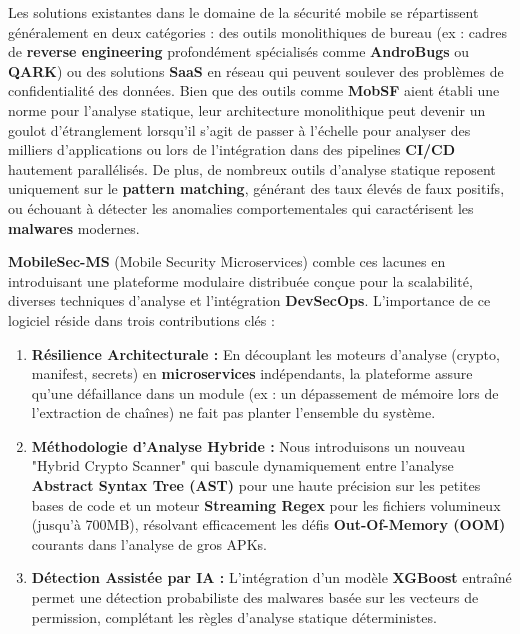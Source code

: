 \documentclass[
  journal=largetwo,
  manuscript=article-type,
  year=2025,
  volume=1,
]{cup-journal}
\begin{document}
Les solutions existantes dans le domaine de la sécurité mobile se répartissent généralement en deux catégories : des outils monolithiques de bureau (ex : cadres de \textbf{reverse engineering} profondément spécialisés comme \textbf{AndroBugs} ou \textbf{QARK}) ou des solutions \textbf{SaaS} en réseau qui peuvent soulever des problèmes de confidentialité des données. Bien que des outils comme \textbf{MobSF} aient établi une norme pour l'analyse statique, leur architecture monolithique peut devenir un goulot d'étranglement lorsqu'il s'agit de passer à l'échelle pour analyser des milliers d'applications ou lors de l'intégration dans des pipelines \textbf{CI/CD} hautement parallélisés. De plus, de nombreux outils d'analyse statique reposent uniquement sur le \textbf{pattern matching}, générant des taux élevés de faux positifs, ou échouant à détecter les anomalies comportementales qui caractérisent les \textbf{malwares} modernes.

\textbf{MobileSec-MS} (Mobile Security Microservices) comble ces lacunes en introduisant une plateforme modulaire distribuée conçue pour la scalabilité, diverses techniques d'analyse et l'intégration \textbf{DevSecOps}. L'importance de ce logiciel réside dans trois contributions clés :
\begin{enumerate}
    \item \textbf{Résilience Architecturale :} En découplant les moteurs d'analyse (crypto, manifest, secrets) en \textbf{microservices} indépendants, la plateforme assure qu'une défaillance dans un module (ex : un dépassement de mémoire lors de l'extraction de chaînes) ne fait pas planter l'ensemble du système.
    \item \textbf{Méthodologie d'Analyse Hybride :} Nous introduisons un nouveau "Hybrid Crypto Scanner" qui bascule dynamiquement entre l'analyse \textbf{Abstract Syntax Tree (AST)} pour une haute précision sur les petites bases de code et un moteur \textbf{Streaming Regex} pour les fichiers volumineux (jusqu'à 700MB), résolvant efficacement les défis \textbf{Out-Of-Memory (OOM)} courants dans l'analyse de gros APKs.
    \item \textbf{Détection Assistée par IA :} L'intégration d'un modèle \textbf{XGBoost} entraîné permet une détection probabiliste des malwares basée sur les vecteurs de permission, complétant les règles d'analyse statique déterministes.
\end{enumerate}

\end{document}
